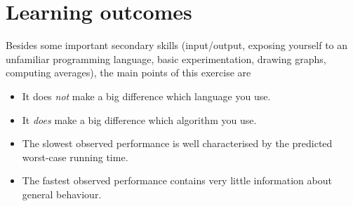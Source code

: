 \documentclass{tufte-handout}
\begin{document}
\section{Learning outcomes}

Besides some important secondary skills (input/output, exposing yourself to an unfamiliar programming language, basic experimentation, drawing graphs, computing averages), the main points of this exercise are
\begin{itemize}
  \item It does \emph{not} make a big difference which language you use.
  \item It \emph{does} make a big difference which algorithm you use.
  \item The slowest observed performance is well characterised by the predicted worst-case running time.
  \item The fastest observed performance contains very little information about general behaviour.
\end{itemize}
\end{document}
